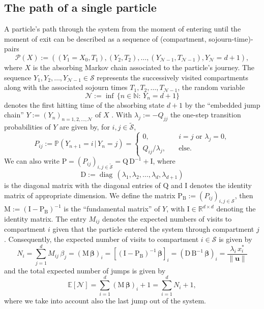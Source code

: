 \documentclass[smallextended]{svjour3}
\renewcommand{\tens}[1]{\mathrm{#1}}
\renewcommand{\vec}[1]{\mathbf{#1}}
\newcommand{\R}{\mathbb{R}}
\newcommand{\N}{\mathbb{N}}
\renewcommand{\P}{\mathbb{P}}
\newcommand{\E}{\mathbb{E}}
\newcommand{\suml}{\sum\limits}
\newcommand{\vnorms}[1]{\|#1\|}
\newcommand{\diag}{\operatorname{diag}}
\renewcommand{\emph}[1]{``#1''}
\begin{document}
\subsection{The path of a single particle}
A particle's path through the system from the moment of entering until the moment of exit can be described as a sequence of (compartment, sojourn-time)-pairs
\begin{equation}
  \label{eqn:path}
  \mathcal{P}(X) := ((Y_1=X_0, T_1),(Y_2,T_2),\ldots,(Y_{\mathcal{N}-1},T_{\mathcal{N}-1}), Y_{\mathcal{N}}=d+1),
\end{equation}
where $X$ is the absorbing Markov chain associated to the particle's journey.
The sequence $Y_1,Y_2,\ldots,Y_{\mathcal{N}-1}\in\mathcal{S}$ represents the successively visited compartments along with the associated sojourn times $T_1,T_2,\ldots,T_{\mathcal{N}-1}$, the random variable
\begin{equation}
  \mathcal{N}:=\inf\,\{n\in\N:\,Y_n=d+1\}
\end{equation}
denotes the first hitting time of the absorbing state $d+1$ by the \emph{embedded jump chain} $Y:=(Y_n)_{n=1,2,\ldots,\mathcal{N}}$ of $X$ \citep{Norris1997}.
With $\lambda_j:=-Q_{jj}$ the one-step transition probabilities of $Y$ are given by, for $i,j\in\widetilde{\mathcal{S}}$,
\begin{equation}\label{eqn:P_ij}
  P_{ij}:=\P(Y_{n+1}=i\,|\,Y_n=j) = 
  \begin{cases}
    0,\quad & i=j\text{ or }\lambda_j=0,\\
    Q_{ij}/\lambda_j,\quad & \text{else}.
  \end{cases}
\end{equation}
We can also write $\tens{P}=(P_{ij})_{i,j\in\widetilde{\mathcal{S}}}=\tens{Q}\,\tens{D}^{-1} + \tens{I}$, where
\begin{equation}
  \tens{D} := \diag\,(\lambda_1,\lambda_2,\ldots,\lambda_d,\lambda_{d+1})
\end{equation}
is the diagonal matrix with the diagonal entries of $\tens{Q}$ and $\tens{I}$ denotes the identity matrix of appropriate dimension.
We define the matrix $\tens{P}_{\tens{B}} := (P_{ij})_{i,j\in\mathcal{S}}$, then $\tens{M}:=(\tens{I}-\tens{P}_{\tens{B}})^{-1}$ is the \emph{fundamental matrix} of $Y$, with $\tens{I}\in\R^{d\times d}$ denoting the identity matrix.
The entry $M_{ij}$ denotes the expected numbers of visits to compartment $i$ given that the particle entered the system through compartment $j$.
Consequently, the expected number of visits to compartment $i\in\mathcal{S}$ is given by 
\begin{equation}
  \label{eqn:N_i}
  N_i = \suml_{j=1}^d M_{ij}\,\beta_j = (\tens{M}\,\vec{\beta})_i = \left[(\tens{I}-\tens{P}_{\tens{B}})^{-1}\,\vec{\beta}\right]_i 
  = (\tens{D}\,\tens{B}^{-1}\,\vec{\beta})_i
  = \frac{\lambda_i\,x^\ast_i}{\vnorms{\vec{u}}}
\end{equation}
and the total expected number of jumps is given by
\begin{equation}
  \E\left[\mathcal{N}\right] = \suml_{i=1}^d (\tens{M}\,\vec{\beta})_i+1= \suml_{i=1}^d N_i+1,
\end{equation}
where we take into account also the last jump out of the system.
\end{document}
